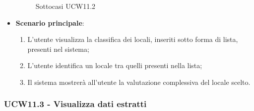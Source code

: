 \begin{itemize}
\begin{figure}[H]
	\caption{Sottocasi UCW11.2}
	\end{figure}
    \item \textbf{Scenario principale}: 
    \begin{enumerate}
	\item L'utente visualizza la classifica dei locali, inseriti sotto forma di lista, presenti nel sistema;    
    \item L'utente identifica un locale tra quelli presenti nella lista;
    \item Il sistema mostrerà all'utente la valutazione complessiva del locale scelto.
    \end{enumerate}
\end{itemize}

\subsubsection{UCW11.3 - Visualizza dati estratti}
